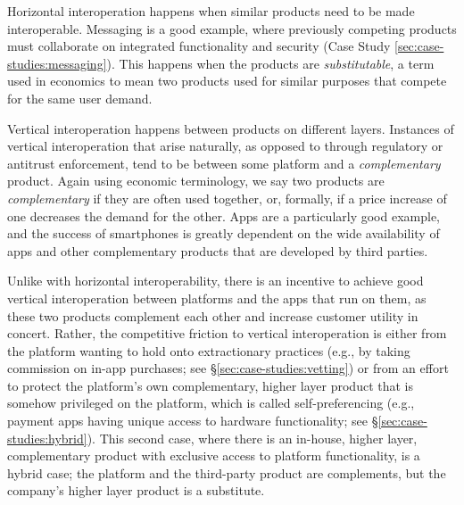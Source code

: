 \documentclass[letterpaper,twocolumn,10pt]{article}
\begin{document}
Horizontal interoperation happens when similar products need to be made interoperable. Messaging is a good example, where previously competing products must collaborate on integrated functionality and security (Case Study \ref{sec:case-studies:messaging}). This happens when the products are \emph{substitutable}, a term used in economics to mean two products used for similar purposes that compete for the same user demand. %

Vertical interoperation happens between products on different layers. Instances of vertical interoperation that arise naturally, as opposed to through regulatory or antitrust enforcement, tend to be between some platform and a \emph{complementary} product. Again using economic terminology, we say two products are \emph{complementary} if they are often used together, or, formally, if a price increase of one decreases the demand for the other. Apps are a particularly good example, and the success of smartphones is greatly dependent on the wide availability of apps and other complementary products that are developed by third parties.

Unlike with horizontal interoperability, there is an incentive to achieve good vertical interoperation between platforms and the apps that run on them, as these two products complement each other and increase customer utility in concert.  Rather, the competitive friction to vertical interoperation is either from the platform wanting to hold onto extractionary practices (e.g., by taking commission on in-app purchases; see \S\ref{sec:case-studies:vetting}) or from an effort to protect the platform's own complementary, higher layer product that is somehow privileged on the platform, which is called self-preferencing (e.g., payment apps having unique access to hardware functionality; see \S\ref{sec:case-studies:hybrid}).  This second case, where there is an in-house, higher layer, complementary product with exclusive access to platform functionality, is a hybrid case; the platform and the third-party product are complements, but the company's higher layer product is a substitute. 
\end{document}
